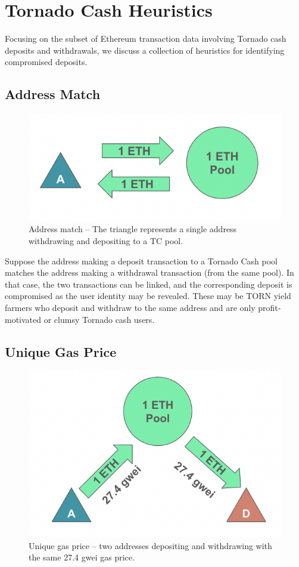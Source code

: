 \section{Tornado Cash Heuristics}
\label{sec:tornado}

Focusing on the subset of Ethereum transaction data involving Tornado cash deposits and withdrawals, we discuss a collection of heuristics for identifying compromised deposits.

\subsection{Address Match}

\begin{figure}[h!]
\centering
\includegraphics[width=0.75\linewidth]{figures/tcash/h1.png}
\caption{Address match -- The triangle represents a single address withdrawing and depositing to a TC pool.}
\label{fig:tornado}
\end{figure}

Suppose the address making a deposit transaction to a Tornado Cash pool matches the address making a withdrawal transaction (from the same pool). In that case, the two transactions can be linked, and the corresponding deposit is compromised as the user identity may be revealed. These may be TORN yield farmers who deposit and withdraw to the same address and are only profit-motivated or clumsy Tornado cash users.

\subsection{Unique Gas Price}

\begin{figure}[h!]
\centering
\includegraphics[width=0.7\linewidth]{figures/tcash/h2.png}
\caption{Unique gas price -- two addresses depositing and withdrawing with the same 27.4 gwei gas price.}
\label{fig:tornado}
\end{figure}

